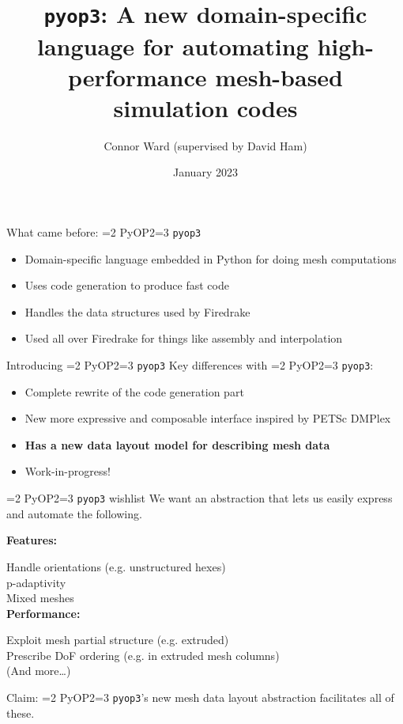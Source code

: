 \documentclass{beamer}
\title{\texttt{pyop3}: A new domain-specific language for automating high-performance mesh-based simulation codes}
\author{Connor Ward (supervised by David Ham)}
\date{January 2023}
\newcommand{\unchecked}{\makebox[0pt][l]{$\square$}\raisebox{.15ex}{\hspace{0.1em}$\quad$}}
\def\pyop#1{\ifnum#1=2 {PyOP2}\else \ifnum#1=3 {\texttt{pyop3}}\fi \fi}
\begin{document}
\frame{\titlepage}

\begin{frame}{What came before: \pyop2}
  \begin{itemize}
    \item Domain-specific language embedded in Python for doing mesh computations
    \item Uses code generation to produce fast code
    \item Handles the data structures used by Firedrake
    \item Used all over Firedrake for things like assembly and interpolation
  \end{itemize}
\end{frame}

\begin{frame}{Introducing \pyop3}
  Key differences with \pyop2:
  \begin{itemize}
    \item Complete rewrite of the code generation part
    \item New more expressive and composable interface inspired by PETSc DMPlex
    \item \textbf{Has a new data layout model for describing mesh data}
    \item Work-in-progress!
  \end{itemize}
\end{frame}

\begin{frame}{\pyop3 wishlist}
  We want an abstraction that lets us easily express and automate the following.

  \textbf{Features:}

  \unchecked Handle orientations (e.g. unstructured hexes) \\
  \unchecked p-adaptivity \\
  \unchecked Mixed meshes \\

  \textbf{Performance:}

  \unchecked Exploit mesh partial structure (e.g. extruded) \\
  \unchecked Prescribe DoF ordering (e.g. in extruded mesh columns) \\

  (And more\dots)
\end{frame}

\begin{frame}
  Claim: \pyop3's new mesh data layout abstraction facilitates all of these. 
\end{frame}
\end{document}
